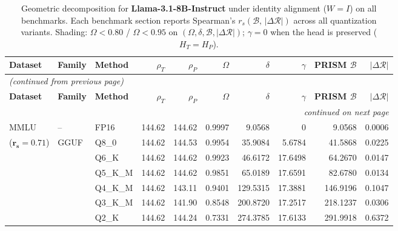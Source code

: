 \begingroup
\small
\setlength{\tabcolsep}{4pt}
\renewcommand{\arraystretch}{1.05}
\setlength{\LTcapwidth}{\textwidth}
\begin{longtable}{ll l rrrrrrr}
\caption{Geometric decomposition for \textbf{Llama-3.1-8B-Instruct} under identity alignment ($W{=}I$) on all benchmarks. Each benchmark section reports Spearman's $r_s(\mathcal{B},\,|\Delta\mathcal{R}|)$ across all quantization variants. Shading: \colorbox{red!35}{$\Omega{<}0.80$} / \colorbox{red!18}{$\Omega{<}0.95$} on $(\Omega,\delta,\mathcal{B},|\Delta\mathcal{R}|)$; \colorbox{cyan!12}{$\gamma{=}0$} when the head is preserved ($H_T{=}H_P$).}\label{tab:llama_instruct_decomposition_all_bound}\\
\toprule
\textbf{Dataset} & \textbf{Family} & \textbf{Method} & \textbf{$\rho_T$} & \textbf{$\rho_P$} & \textbf{$\Omega$} & \textbf{$\delta$} & \textbf{$\gamma$} & \textbf{PRISM $\mathcal{B}$} & \textbf{$|\Delta\mathcal{R}|$} \\
\midrule
\endfirsthead
\multicolumn{10}{l}{\small\itshape (continued from previous page)}\\
\toprule
\textbf{Dataset} & \textbf{Family} & \textbf{Method} & \textbf{$\rho_T$} & \textbf{$\rho_P$} & \textbf{$\Omega$} & \textbf{$\delta$} & \textbf{$\gamma$} & \textbf{PRISM $\mathcal{B}$} & \textbf{$|\Delta\mathcal{R}|$} \\
\midrule
\endhead
\midrule
\multicolumn{10}{r}{\small\itshape continued on next page}\\
\endfoot
\bottomrule
\endlastfoot
MMLU & -- & FP16 & 144.62 & 144.62 & 0.9997 & 9.0568 & \cellcolor{cyan!12} $0$ & 9.0568 & 0.0006 \\
{\small ($\mathbf{r_s{=}0.71}$)} & GGUF & Q8\_0 & 144.62 & 144.53 & 0.9954 & 35.9084 & 5.6784 & 41.5868 & 0.0225 \\
 &  & Q6\_K & 144.62 & 144.62 & 0.9923 & 46.6172 & 17.6498 & 64.2670 & 0.0147 \\
 &  & Q5\_K\_M & 144.62 & 144.62 & 0.9851 & 65.0189 & 17.6591 & 82.6780 & 0.0134 \\
 &  & Q4\_K\_M & 144.62 & 143.11 & \cellcolor{red!18} 0.9401 & \cellcolor{red!18} 129.5315 & 17.3881 & \cellcolor{red!18} 146.9196 & \cellcolor{red!18} 0.1047 \\
 &  & Q3\_K\_M & 144.62 & 141.90 & \cellcolor{red!18} 0.8548 & \cellcolor{red!18} 200.8720 & 17.2517 & \cellcolor{red!18} 218.1237 & \cellcolor{red!18} 0.0306 \\
 &  & Q2\_K & 144.62 & 144.24 & \cellcolor{red!35} 0.7331 & \cellcolor{red!35} 274.3785 & 17.6133 & \cellcolor{red!35} 291.9918 & \cellcolor{red!35} 0.6372 \\

\end{longtable}
